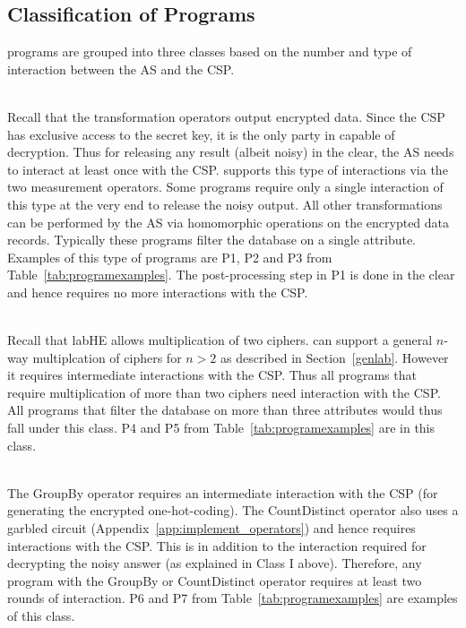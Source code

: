 \subsection{Classification of \system Programs}
\system programs are grouped into three classes based on the number and type of interaction between the \textsf{AS} and the \textsf{CSP}. 

\\
Recall that the transformation operators output encrypted data.  Since  the \textsf{CSP} has exclusive access to the secret key, it is the only party in \system capable of decryption. Thus for releasing any result (albeit noisy) in the clear, the \textsf{AS} needs to interact at least once with the \textsf{CSP}. \system supports this type of interactions via the two measurement operators. Some \system programs require only a single interaction of this type at the very end to release the noisy output. All other transformations can be performed by the \textsf{AS} via homomorphic operations on the encrypted data records. Typically these programs filter the database on a single attribute. Examples of this type of programs are P1, P2 and P3 from Table~\ref{tab:programexamples}. The post-processing step in P1 is done in the clear and hence requires no more interactions with the \textsf{CSP}.



\\
Recall that \textsf{labHE} allows multiplication of two ciphers. \system can support a general $n$-way multiplcation of ciphers for $n > 2$ as described in Section~\ref{genlab}. However it requires intermediate interactions with the \textsf{CSP}. Thus all \system programs that require multiplication of more than two ciphers need interaction with the \textsf{CSP}.  All programs that filter the database on more than three attributes would thus fall under this class. P4 and P5 from Table~\ref{tab:programexamples} are in this class.

\\
 The \textsf{GroupBy} operator requires an intermediate interaction with the \textsf{CSP} (for generating the encrypted one-hot-coding). The \textsf{CountDistinct} operator also uses a garbled circuit (Appendix~\ref{app:implement_operators}) and hence requires interactions with the \textsf{CSP}. This is in addition to the interaction required for decrypting the noisy answer (as explained in Class I above). Therefore, any program with the \textsf{GroupBy} or \textsf{CountDistinct} operator requires at least two rounds of interaction. P6 and P7 from Table~\ref{tab:programexamples} are examples of this class. 



